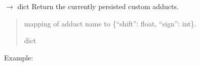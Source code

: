 \documentclass[letterpaper,10pt,english]{sphinxmanual}
\begin{document}
\begin{fulllineitems}
\label{\detokenize{api:utils.neutral_mass.list_adducts}}
\pysigstartsignatures
\pysiglinewithargsret
{}
{}
{{ $\rightarrow$ dict}}
\pysigstopsignatures
\sphinxAtStartPar
Return the currently persisted custom adducts.
\begin{quote}\begin{description}
\sphinxAtStartPar
mapping of adduct name to \{“shift”: float, “sign”: int\}.

\sphinxAtStartPar
dict

\end{description}\end{quote}

\sphinxAtStartPar
Example:

\begin{sphinxVerbatim}[commandchars=\\\{\}]
\end{sphinxVerbatim}

\end{fulllineitems}

\end{document}
